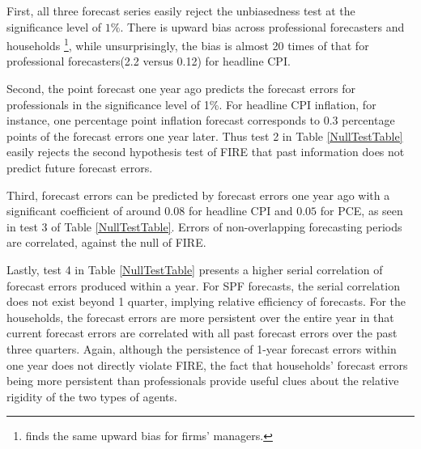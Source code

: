 \documentclass[]{article}
\begin{document}
	First,  all three forecast series easily reject the unbiasedness test at the significance level of $1\%$. There is upward bias across professional forecasters and households \footnote{\citet{coibion2018firms} finds the same upward bias for firms' managers.}, while unsurprisingly, the bias is almost 20 times of that for professional forecasters(2.2 versus 0.12) for headline CPI. 
	
	Second, the point forecast one year ago predicts the forecast errors for professionals in the significance level of 1\%. For headline CPI inflation, for instance, one percentage point inflation forecast corresponds to 0.3 percentage points of the forecast errors one year later. Thus test 2 in Table \ref{NullTestTable} easily rejects the second hypothesis test of FIRE that past information does not predict future forecast errors. 
	
	Third, forecast errors can be predicted by forecast errors one year ago with a significant coefficient of around $0.08$ for headline CPI and $0.05$ for PCE, as seen in test 3 of Table \ref{NullTestTable}. Errors of non-overlapping forecasting periods are correlated, against the null of FIRE. 
	
	Lastly, test 4 in Table \ref{NullTestTable} presents a higher serial correlation of forecast errors produced within a year. For SPF forecasts, the serial correlation does not exist beyond 1 quarter, implying relative efficiency of forecasts. For the households, the forecast errors are more persistent over the entire year in that current forecast errors are correlated with all past forecast errors over the past three quarters.  Again, although the persistence of 1-year forecast errors within one year does not directly violate FIRE, the fact that households' forecast errors being more persistent than professionals provide useful clues about the relative rigidity of the two types of agents. 
	
\end{document}
